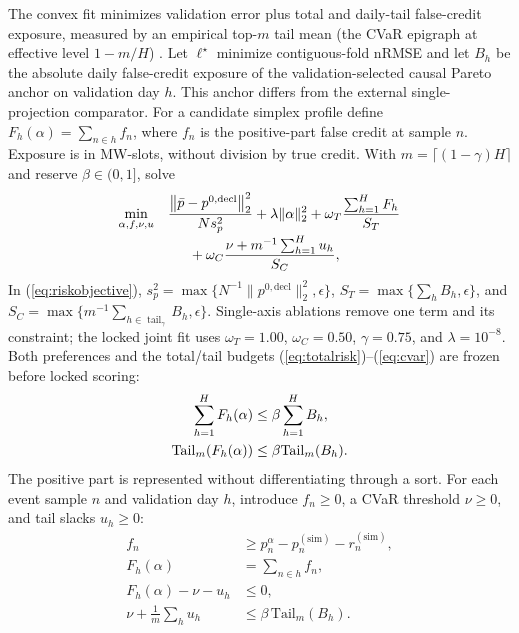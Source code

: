 \documentclass[10pt,journal]{IEEEtran}
\begin{document}
The convex fit minimizes validation error plus total and daily-tail false-credit
exposure, measured by an empirical top-$m$ tail mean (the CVaR epigraph at effective level
$1-m/H$) \cite{rockafellar2000cvar}. Let $\ell^\star$ minimize contiguous-fold nRMSE and
let $B_h$ be the absolute daily false-credit exposure of the validation-selected
causal Pareto anchor on validation day $h$. This anchor differs from the external single-projection comparator.
For a candidate simplex profile define
$F_h(\alpha)=\sum_{n\in h}f_n$, where $f_n$ is the positive-part false
credit at sample $n$. Exposure is in MW-slots, without division by true credit. With
$m=\lceil(1-\gamma)H\rceil$ and reserve $\beta\in(0,1]$, solve
\begin{equation}
\begin{aligned}
\min_{\alpha,f,\nu,u}\quad
&\frac{\left\|\bar p-p^{0,\mathrm{decl}}\right\|_2^2}{N s_p^2}
 +\lambda\|\alpha\|_2^2
 +\omega_T\frac{\sum_{h=1}^{H}F_h}{S_T}\\[-2pt]
&\hspace{1.5em}+\omega_C\frac{\nu+m^{-1}\sum_{h=1}^{H}u_h}{S_C},
\end{aligned}
\label{eq:riskobjective}
\end{equation}
In (\ref{eq:riskobjective}),
$s_p^2=\max\{N^{-1}\|p^{0,\mathrm{decl}}\|_2^2,\epsilon\}$,
$S_T=\max\{\sum_hB_h,\epsilon\}$, and
$S_C=\max\{m^{-1}\sum_{h\in\operatorname{tail}_\gamma}B_h,\epsilon\}$.
Single-axis ablations remove one term and its constraint; the locked joint fit
uses $\omega_T=1.00$, $\omega_C=0.50$, $\gamma=0.75$, and $\lambda=10^{-8}$.
Both preferences and the total/tail budgets (\ref{eq:totalrisk})--(\ref{eq:cvar})
are frozen before locked scoring:
\begin{align}
 \sum_{h=1}^{H}F_h(\alpha)&\leq\beta\sum_{h=1}^{H}B_h,\label{eq:totalrisk}\\
 {\rm Tail}_{m}\!\left(F_h(\alpha)\right)
 &\leq\beta{\rm Tail}_{m}(B_h).\label{eq:cvar}
\end{align}
The positive part is represented without differentiating through a sort. For
each event sample $n$ and validation day $h$, introduce
$f_n\geq0$, a CVaR threshold $\nu\geq0$, and tail slacks $u_h\geq0$:
\begin{align}
 f_n&\geq p^\alpha_n-p^{(\mathrm{sim})}_n-r^{(\mathrm{sim})}_n,\\
F_h(\alpha)&=\sum_{n\in h}f_n,\\
 F_h(\alpha)-\nu-u_h&\leq0,\\
 \nu+\frac{1}{m}\sum_h u_h
 &\leq\beta\,\mathrm{Tail}_{m}(B_h).
 \label{eq:riskepigraph}
\end{align}
\end{document}

